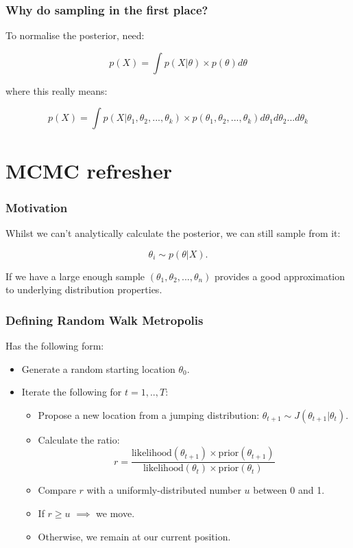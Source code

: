 \documentclass[handout]{beamer}
\begin{document}
\begin{frame}
\frametitle{Why do sampling in the first place?}

	To normalise the posterior, need:
	
	\begin{equation}
	p(X) = \int p(X|\theta)\times p(\theta) d\theta
	\end{equation}
	
	where this really means:
	
	\begin{equation}
	p(X) = \int p(X|\theta_1,\theta_2,...,\theta_k)\times p(\theta_1,\theta_2,...,\theta_k) d\theta_1d\theta_2...d\theta_k
	\end{equation}

\end{frame}


\section{MCMC refresher}
\frame{\tableofcontents[currentsection]}

\begin{frame}
	\frametitle{Motivation}
	
	Whilst we can't analytically calculate the posterior, we can still sample from it:
	
	\begin{equation}
		\theta_i \sim p(\theta|X).
	\end{equation}
	
	If we have a large enough sample $(\theta_1,\theta_2,...,\theta_n)$ provides a good approximation to underlying distribution properties.
	
	
\end{frame}

\begin{frame}
\frametitle{Defining Random Walk Metropolis}
 Has the following form:

\begin{itemize}
\item<2-> Generate a random starting location $\theta_0$.
\item<3-> Iterate the following for $t=1,..,T$:
\begin{itemize}
\item<4-> Propose a new location from a jumping distribution: $\theta_{t+1}\sim J(\theta_{t+1}|\theta_t)$.
\item<5-> Calculate the ratio:
\begin{equation}
r = \frac{\text{likelihood}(\theta_{t+1})\times\text{prior}(\theta_{t+1})}{\text{likelihood}(\theta_{t})\times\text{prior}(\theta_{t})}
\end{equation}
\item<7-> Compare $r$ with a uniformly-distributed number $u$ between 0 and 1.
\item<8-> If $r\geq u$ $\implies$ we move.
\item<9-> Otherwise, we remain at our current position.
\end{itemize}
\end{itemize}

\end{frame}
\end{document}
